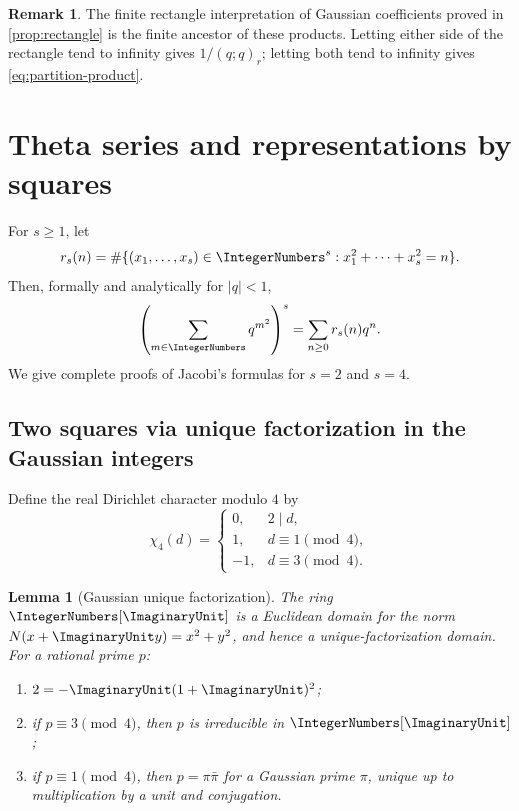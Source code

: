 \documentclass[11pt,oneside]{article}
\newtheorem{lemma}[theorem]{Lemma}
\theoremstyle{definition}
\newtheorem{remark}[theorem]{Remark}
\begin{document}
\begin{remark}
The finite rectangle interpretation of Gaussian coefficients proved in
\cref{prop:rectangle} is the finite ancestor of these products.
Letting either side of the rectangle tend to infinity gives
$1/(q;q)_r$; letting both tend to infinity gives
\eqref{eq:partition-product}.
\end{remark}


\section{Theta series and representations by squares}\label{sec:squares}

For $s\ge1$, let
\[
 r_s(n)=\#\{(x_1,\ldots,x_s)\in\IntegerNumbers^s:x_1^2+\cdots+x_s^2=n\}.
\]
Then, formally and analytically for $|q|<1$,
\begin{equation}\label{eq:rs-theta}
 \left(\sum_{m\in\IntegerNumbers}q^{m^2}\right)^s
 =\sum_{n\ge0}r_s(n)q^n.
\end{equation}
We give complete proofs of Jacobi's formulas for $s=2$ and $s=4$.

\subsection{Two squares via unique factorization in the Gaussian integers}

Define the real Dirichlet character modulo $4$ by
\[
 \chi_4(d)=
 \begin{cases}
  0,&2\mid d,\\
  1,&d\equiv1\pmod4,\\
 -1,&d\equiv3\pmod4.
 \end{cases}
\]

\begin{lemma}[Gaussian unique factorization]\label{lem:gaussian-ufd}
The ring $\IntegerNumbers[\ImaginaryUnit]$ is a Euclidean domain for the norm
$N(x+\ImaginaryUnit y)=x^2+y^2$, and hence a unique-factorization domain.
For a rational prime $p$:
\begin{enumerate}[label=\textup{(\roman*)}]
\item $2=-\ImaginaryUnit(1+\ImaginaryUnit)^2$;
\item if $p\equiv3\pmod4$, then $p$ is irreducible in $\IntegerNumbers[\ImaginaryUnit]$;
\item if $p\equiv1\pmod4$, then
      $p=\pi\bar\pi$ for a Gaussian prime $\pi$, unique up to multiplication
      by a unit and conjugation.
\end{enumerate}
\end{lemma}
\end{document}
